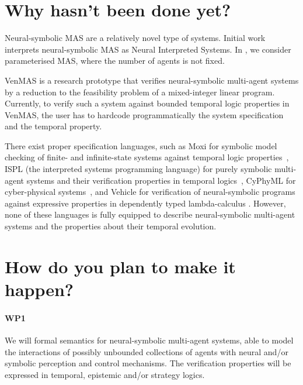 \documentclass[11pt]{article}
\begin{document}
\section{Why hasn't been done yet?}



Neural-symbolic MAS are a relatively novel type of systems. Initial
work \cite{Akintunde+18,Akintunde+20,Akintunde+22} interprets
neural-symbolic MAS as Neural Interpreted Systems. In
\cite{KouvarosBB24}, we consider parameterised MAS, where the number
of agents is not fixed.

VenMAS \cite{Akintunde+22b} is a research prototype that verifies
neural-symbolic multi-agent systems by a reduction to the feasibility
problem of a mixed-integer linear program.  Currently, to verify such
a system against bounded temporal logic properties in VenMAS, the user
has to hardcode programmatically the system specification and the
temporal property.

There exist proper specification languages, such as Moxi for symbolic model
checking of finite- and infinite-state systems against temporal logic
properties~\cite{Rozier+2024}, ISPL (the interpreted systems
programming language) for purely symbolic multi-agent systems and
their verification properties in temporal logics~\cite{LomuscioQR17},
CyPhyML for cyber-physical systems~\cite{Simko+13}, and Vehicle for
verification of neural-symbolic programs against expressive properties
in dependently typed lambda-calculus \cite{Daggitt+24}. However, none
of these languages is fully equipped to describe neural-symbolic
multi-agent systems and the properties about their temporal evolution.


\section{How do you plan to make it happen?}


\paragraph{WP1} We will formal semantics for neural-symbolic
multi-agent systems, able to model the interactions of possibly
unbounded collections of agents with neural and/or symbolic perception
and control mechanisms. The verification properties will be expressed
in temporal, epistemic and/or strategy logics.
\end{document}
